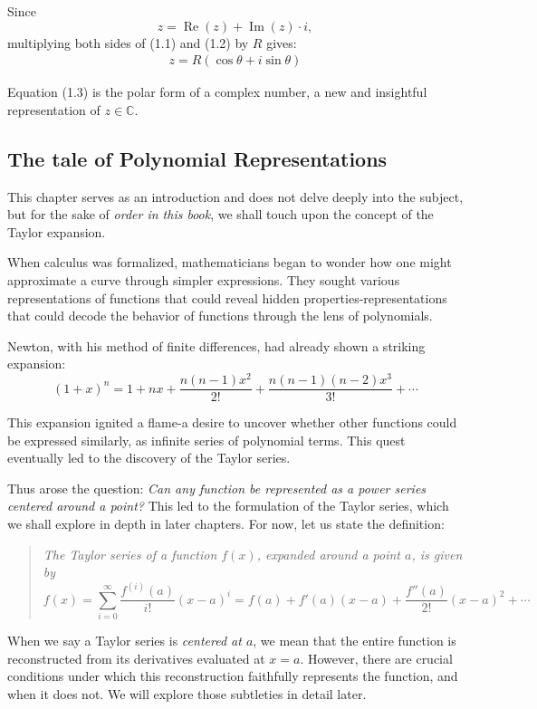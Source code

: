 Since
\[
z = \operatorname{Re}(z) + \operatorname{Im}(z) \cdot i,
\]
multiplying both sides of (1.1) and (1.2) by $R$ gives:
\begin{align}
z = R\left( \cos \theta + i \sin \theta \right) \tag{1.3}
\end{align}

Equation (1.3) is the polar form of a complex number, a new and insightful representation of $z \in \mathbb{C}$.

\subsection*{The tale of Polynomial Representations}

This chapter serves as an introduction and does not delve deeply into the subject, but for the sake of \emph{order in this book}, we shall touch upon the concept of the Taylor expansion.

\vspace{1em}
When calculus was formalized, mathematicians began to wonder how one might approximate a curve through simpler expressions. They sought various representations of functions that could reveal hidden properties-representations that could decode the behavior of functions through the lens of polynomials.

\vspace{1em}
Newton, with his method of finite differences, had already shown a striking expansion:
\[
(1 + x)^n = 1 + nx + \frac{n(n-1)x^2}{2!} + \frac{n(n-1)(n-2)x^3}{3!} + \dotsb
\]

This expansion ignited a flame-a desire to uncover whether other functions could be expressed similarly, as infinite series of polynomial terms. This quest eventually led to the discovery of the Taylor series.

\vspace{1em}
Thus arose the question: \emph{Can any function be represented as a power series centered around a point?} This led to the formulation of the Taylor series, which we shall explore in depth in later chapters. For now, let us state the definition:

\begin{quote}
\emph{The Taylor series of a function $f(x)$, expanded around a point $a$, is given by}
\[
f(x) = \sum_{i=0}^{\infty} \frac{f^{(i)}(a)}{i!} (x - a)^i = f(a) + f'(a)(x-a) + \frac{f''(a)}{2!}(x-a)^2 + \dotsb
\]
\end{quote}

\vspace{1em}
When we say a Taylor series is \emph{centered at $a$}, we mean that the entire function is reconstructed from its derivatives evaluated at $x = a$. However, there are crucial conditions under which this reconstruction faithfully represents the function, and when it does not. We will explore those subtleties in detail later.

